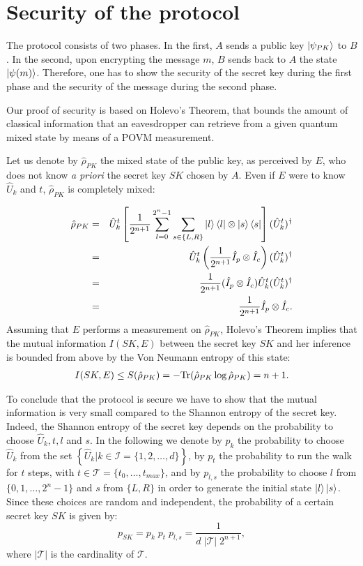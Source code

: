 \section{Security of the protocol}
\label{sec:secpk}
The protocol consists of two phases. In the first, $A$ sends a public key $\Ket{\psi_{PK}}$ to $B$. In the second, upon encrypting the message $m$, $B$ sends back to $A$ the state $\Ket{\psi(m)}$. Therefore, one has to show the security of the secret key during the first phase and the security of the message during the second phase.

Our proof of security is based on Holevo's Theorem, that bounds the amount of classical information that an eavesdropper can retrieve from a given quantum mixed state by means of a POVM measurement.

Let us denote by $\hat{\rho}_{PK}$ the mixed state of the public key, as perceived by $E$, who does not know \textit{a priori} the secret key $SK$ chosen by $A$. 
Even if $E$ were to know $\hat U_k$ and $t$, $\hat{\rho}_{PK}$ is completely mixed:

\begin{eqnarray}
\hat{\rho}_{PK} 
	&=& \hat{U}_k^t\left[\frac{1}{2^{n+1}} \sum_{l = 0}^{2^n-1} \sum_{s\in\{ L,R\}} \Ket{l} \Bra{l} \otimes \Ket{s} \Bra{s}\right](\hat{U}_k^t)^{\dagger}\nonumber\\
	&=& \hat{U}_k^t \left(\frac{1}{2^{n+1}} \hat{I}_p \otimes \hat{I}_c\right) (\hat{U}_k^t)^{\dagger} %
	\\
	&=& \frac{1}{2^{n+1}} (\hat{I}_p \otimes \hat{I}_c)\hat{U}_k^t (\hat{U}_k^t)^{\dagger} \\
	&=& \frac{1}{2^{n+1}} \hat{I}_p \otimes \hat{I}_c\nonumber.
\end{eqnarray}
Assuming that $E$ performs a measurement on $\hat{\rho}_{PK}$, Holevo's Theorem implies that the mutual information $I(SK,E)$ between the secret key $SK$ and her inference is bounded from above by the Von Neumann entropy of this state:
\begin{eqnarray}
I(SK,E) \leq S(\hat{\rho}_{PK})=-\text{Tr}(\hat{\rho}_{PK} \log\hat{\rho}_{PK} )=n+1.
\end{eqnarray}


To conclude that the protocol is secure we have to show that the mutual information is very small compared to the Shannon entropy of the secret key.
Indeed, the Shannon entropy of the secret key depends on the probability to choose $\hat U_k, t, l$ and  $s$.
In the following we denote by $p_k$ the probability to choose $\hat{U}_k$ from the set $\left\{\hat{U}_k | k\in \mathcal I= \{ 1,2,\dots,d\} \right\}$, by $p_t$ the probability to run the walk for $t$ steps, with $t \in \mathcal T=\{ t_0, \dots, t_{max} \}$, and by $p_{l,s}$ the probability to choose $l$ from $\{0,1,\ldots,2^n-1\}$ and $s$ from $\{L,R\}$ in order to generate the initial state $\Ket{l}| s \rangle$.
Since these choices are random and independent, the probability of a certain secret key $SK$ is given by:
\begin{equation}
p_{SK}=p_k \; p_t \; p_{l,s}=\frac{1}{d\; |\mathcal T|\; 2^{n+1}},
\end{equation}
where $|\mathcal T|$ is the cardinality of $\mathcal T$.



